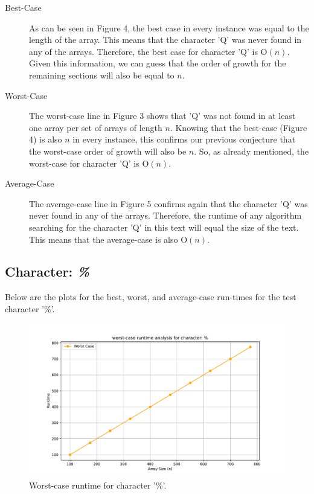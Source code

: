 \documentclass{article}
\begin{document}
\begin{description}
    \item[Best-Case] As can be seen in Figure 4, the best case in every instance was equal to the length of the array. This means that the character 'Q' was never found in any of the arrays. Therefore, the best case for character 'Q' is O$(n)$. Given this information, we can guess that the order of growth for the remaining sections will also be equal to $n$.
    \item[Worst-Case] The worst-case line in Figure 3 shows that 'Q' was not found in at least one array per set of arrays of length $n$. Knowing that the best-case (Figure 4) is also $n$ in every instance, this confirms our previous conjecture that the worst-case order of growth will also be $n$. So, as already mentioned, the worst-case for character 'Q' is O$(n)$.
    \item[Average-Case] The average-case line in Figure 5 confirms again that the character 'Q' was never found in any of the arrays. Therefore, the runtime of any algorithm searching for the character 'Q' in this text will equal the size of the text. This means that the average-case is also O$(n)$.
\end{description}

\subsection{Character: \textit{\%}}
Below are the plots for the best, worst, and average-case run-times for the test character '\%'.

	\begin{figure}[H]
		\centering
		\includegraphics[width=\textwidth]{runtime_analysis_worst_pcnt.pdf}
		\caption{Worst-case runtime for character '\%'.}
	\end{figure}
\end{document}
